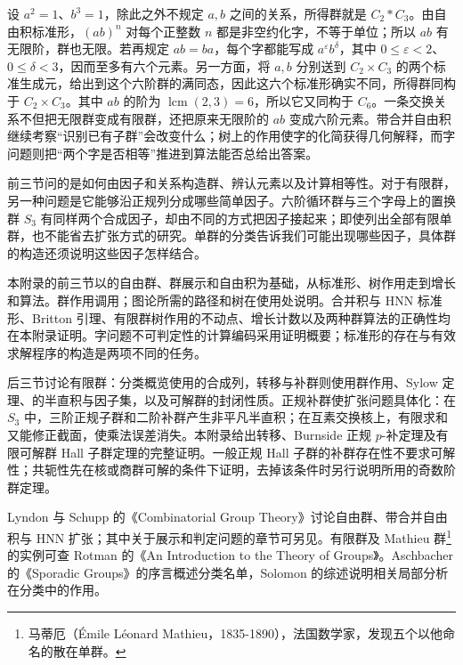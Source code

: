 设 \(a^2=1\)、\(b^3=1\)，除此之外不规定 \(a,b\) 之间的关系，所得群就是 \(C_2*C_3\)。由自由积标准形，\((ab)^n\) 对每个正整数 \(n\) 都是非空约化字，不等于单位；所以 \(ab\) 有无限阶，群也无限。若再规定 \(ab=ba\)，每个字都能写成 \(a^\varepsilon b^\delta\)，其中 \(0\leq\varepsilon<2\)、\(0\leq\delta<3\)，因而至多有六个元素。另一方面，将 \(a,b\) 分别送到 \(C_2\times C_3\) 的两个标准生成元，给出到这个六阶群的满同态，因此这六个标准形确实不同，所得群同构于 \(C_2\times C_3\)。其中 \(ab\) 的阶为 \(\operatorname{lcm}(2,3)=6\)，所以它又同构于 \(C_6\)。一条交换关系不但把无限群变成有限群，还把原来无限阶的 \(ab\) 变成六阶元素。带合并自由积继续考察“识别已有子群”会改变什么；树上的作用使字的化简获得几何解释，而字问题则把“两个字是否相等”推进到算法能否总给出答案。

\ProseParagraphBreak
前三节问的是如何由因子和关系构造群、辨认元素以及计算相等性。对于有限群，另一种问题是它能够沿正规列分成哪些简单因子。六阶循环群与三个字母上的置换群 \(S_3\) 有同样两个合成因子，却由不同的方式把因子接起来；即使列出全部有限单群，也不能省去扩张方式的研究。单群的分类告诉我们可能出现哪些因子，具体群的构造还须说明这些因子怎样结合。

\ProseParagraphBreak

本附录的前三节以的自由群、群展示和自由积为基础，从标准形、树作用走到增长和算法。群作用调用；图论所需的路径和树在使用处说明。合并积与 HNN 标准形、Britton 引理、有限群树作用的不动点、增长计数以及两种群算法的正确性均在本附录证明。字问题不可判定性的计算编码采用证明概要；标准形的存在与有效求解程序的构造是两项不同的任务。

\ProseParagraphBreak
后三节讨论有限群：分类概览使用的合成列，转移与补群则使用群作用、Sylow 定理、的半直积与因子集，以及可解群的封闭性质。正规补群使扩张问题具体化：在 \(S_3\) 中，三阶正规子群和二阶补群产生非平凡半直积；在互素交换核上，有限求和又能修正截面，使乘法误差消失。本附录给出转移、Burnside 正规 \(p\)-补定理及有限可解群 Hall 子群定理的完整证明。一般正规 Hall 子群的补群存在性不要求可解性；共轭性先在核或商群可解的条件下证明，去掉该条件时另行说明所用的奇数阶群定理。

\ProseParagraphBreak
Lyndon 与 Schupp 的《Combinatorial Group Theory》\cite[Chapter I, Sections 1--3, 11; Chapter IV, Sections 1--2]{LyndonSchupp2001}讨论自由群、带合并自由积与 HNN 扩张；其中关于展示和判定问题的章节可另见\cite[Chapter II, Sections 1--2; Chapter IV, Sections 4--5]{LyndonSchupp2001}。有限群及 Mathieu 群\footnote{马蒂厄（Émile Léonard Mathieu，1835-1890），法国数学家，发现五个以他命名的散在单群。}的实例可查 Rotman 的《An Introduction to the Theory of Groups》\cite[Chapter 9]{Rotman1995TheoryGroups}。Aschbacher 的《Sporadic Groups》\cite[Preface, pp. ix--xi]{Aschbacher1994SporadicGroups}的序言概述分类名单，Solomon 的综述\cite[Solvable Signalizer Functor Theorem; Gorenstein--Lyons Trichotomy Theorem]{Solomon2001SimpleGroupsHistory}说明相关局部分析在分类中的作用。

